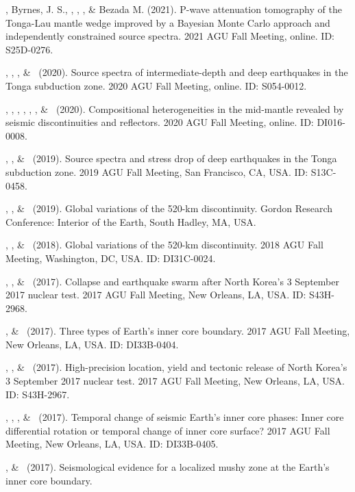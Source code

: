 \begin{etaremune}
\item
    \YZhang, Byrnes, J. S., \SWei, \Me, \FWang, \& Bezada M. (2021).
    P-wave attenuation tomography of the Tonga-Lau mantle wedge improved
    by a Bayesian Monte Carlo approach and independently constrained source spectra.
    2021 AGU Fall Meeting, online. ID: S25D-0276.
\item
    \Me, \WWang, \FWang, \& \SWei\ (2020).
    Source spectra of intermediate-depth and deep earthquakes in the Tonga subduction zone.
    2020 AGU Fall Meeting, online. ID: S054-0012.
\item
    \SWei, \Me, \PShearer, \MLv, \SDorfman, \CLithgowBertelloni, \& \LStixrude\ (2020).
    Compositional heterogeneities in the mid-mantle revealed by seismic discontinuities and reflectors.
    2020 AGU Fall Meeting, online. ID: DI016-0008.
\item
    \Me, \WWang, \& \SWei\ (2019).
    Source spectra and stress drop of deep earthquakes in the Tonga subduction zone.
    2019 AGU Fall Meeting, San Francisco, CA, USA. ID: S13C-0458.
\item
    \Me, \SWei, \& \PShearer\ (2019).
    Global variations of the 520-km discontinuity.
    Gordon Research Conference: Interior of the Earth, South Hadley, MA, USA.
\item
    \Me, \SWei, \& \PShearer\ (2018).
    Global variations of the 520-km discontinuity.
    2018 AGU Fall Meeting, Washington, DC, USA. ID: DI31C-0024.
\item
    \Me, \JYao, \& \LWen\ (2017).
    Collapse and earthquake swarm after North Korea's 3 September 2017 nuclear test.
    2017 AGU Fall Meeting, New Orleans, LA, USA. ID: S43H-2968.
\item
    \Me, \& \LWen\ (2017).
    Three types of Earth's inner core boundary.
    2017 AGU Fall Meeting, New Orleans, LA, USA. ID: DI33B-0404.
\item
    \JYao, \Me, \& \LWen\ (2017).
    High-precision location, yield and tectonic release of North Korea's 3 September 2017 nuclear test.
    2017 AGU Fall Meeting, New Orleans, LA, USA. ID: S43H-2967.
\item
    \JYao, \Me, \LSun, \& \LWen\ (2017).
    Temporal change of seismic Earth's inner core phases: Inner core differential rotation or temporal change of inner core surface?
    2017 AGU Fall Meeting, New Orleans, LA, USA. ID: DI33B-0405.
\item
    \Me, \& \LWen\ (2017).
    Seismological evidence for a localized mushy zone at the Earth's inner core boundary.

\end{etaremune}
